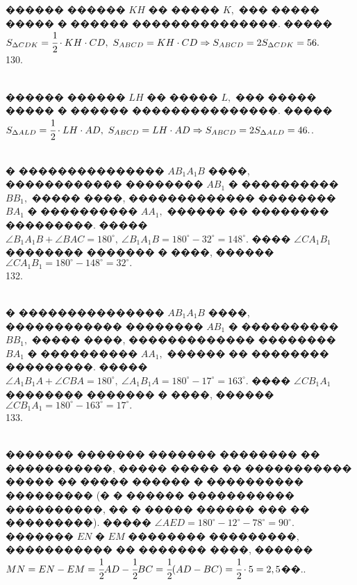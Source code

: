 \documentclass[12pt]{article}
\begin{document}
������ ������ $KH$ �� ����� $K,$ ��� ����� ����� � ������ ���������������. ����� $S_{\Delta CDK}=\cfrac{1}{2}\cdot KH\cdot CD,\ S_{ABCD}=KH\cdot CD\Rightarrow
S_{ABCD}=2S_{\Delta CDK}=56.$\\
130. \begin{figure}[ht!]
\end{figure}\\
������ ������ $LH$ �� ����� $L,$ ��� ����� ����� � ������ ���������������. ����� $S_{\Delta ALD}=\cfrac{1}{2}\cdot LH\cdot AD,\ S_{ABCD}=LH\cdot AD\Rightarrow
S_{ABCD}=2S_{\Delta ALD}=46.$\newpage{}. \begin{figure}[ht!]
\end{figure}\\
� ��������������� $AB_1A_1B$ ����, ������������ �������� $AB_1$ � ���������� $BB_1,$ ����� ����, ������������� �������� $BA_1$ � ���������� $AA_1,$ ������ �� �������� ���������. ����� $\angle B_1A_1B+\angle BAC=180^\circ,\ \angle B_1A_1B=180^\circ-32^\circ=148^\circ.$ ���� $\angle CA_1B_1$ �������� ������� � ����, ������ $\angle CA_1B_1=180^\circ-148^\circ=32^\circ.$\\
132. \begin{figure}[ht!]
\end{figure}\\
� ��������������� $AB_1A_1B$ ����, ������������ �������� $AB_1$ � ���������� $BB_1,$ ����� ����, ������������� �������� $BA_1$ � ���������� $AA_1,$ ������ �� �������� ���������. ����� $\angle A_1B_1A+\angle CBA=180^\circ,\ \angle A_1B_1A=180^\circ-17^\circ=163^\circ.$ ���� $\angle CB_1A_1$ �������� ������� � ����, ������ $\angle CB_1A_1=180^\circ-163^\circ=17^\circ.$\\
133. \begin{figure}[ht!]
\end{figure}\\
������� ������� ������� �������� �� �����������, ����� ����� �� ����������� ����� �� ����� ������ � ���������� ��������� (� � ������ ����������� ����������, �� � ����� ������ ��� �� ���������). ����� $\angle AED=180^\circ-12^\circ-78^\circ=90^\circ.$ ������� $EN$ � $EM$ �������� ���������, ����������� �� ������� ����, ������ $MN=EN-EM=\cfrac{1}{2}AD-\cfrac{1}{2}BC=\cfrac{1}{2}(AD-BC)=\cfrac{1}{2}\cdot5=2,5$��.\newpage{}. \begin{figure}[ht!]
\end{figure}\\
\end{document}
